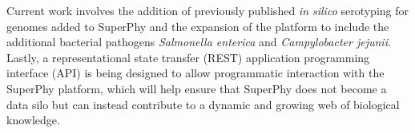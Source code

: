 \documentclass[doublespacing, linenumbers]{bmcart}
\begin{document}
Current work involves the addition of previously published \textit{in silico} serotyping for genomes added to SuperPhy and the expansion of the platform to include the additional bacterial pathogens \textit{Salmonella enterica} and \textit{Campylobacter jejunii}. Lastly, a representational state transfer (REST) application programming interface (API) is being designed to allow programmatic interaction with the SuperPhy platform, which will help ensure that SuperPhy does not become a data silo but can instead contribute to a dynamic and growing web of biological knowledge.
 

\end{document}
